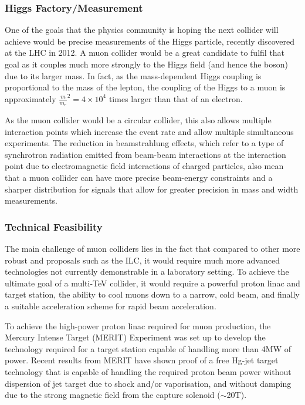 \subsubsection{Higgs Factory/Measurement}
 
One of the goals that the physics community is hoping the next collider will achieve would be precise measurements of the Higgs particle, recently discovered at the LHC in 2012.  A muon collider would be a great candidate to fulfil that goal as it couples much more strongly to the Higgs field (and hence the boson) due to its larger mass. In fact, as the mass-dependent Higgs coupling is proportional to the mass of the lepton, the coupling of the Higgs to a muon is approximately $\frac{m}{m_e}^2 = 4 \times 10^4$ times larger than that of an electron.
 
As the muon collider would be a circular collider, this also allows multiple interaction points which increase the event rate and allow multiple simultaneous experiments. The reduction in beamstrahlung effects, which refer to a type of synchrotron radiation emitted from beam-beam interactions at the interaction point due to electromagnetic field interactions of charged particles, also mean that a muon collider can have more precise beam-energy constraints and a sharper distribution for signals that allow for greater precision in mass and width measurements.

\subsubsection{Technical Feasibility}
 
The main challenge of muon colliders lies in the fact that compared to other more robust and proposals such as the ILC, it would require much more advanced technologies not currently demonstrable in a laboratory setting. To achieve the ultimate goal of a multi-TeV collider, it would require a powerful proton linac and target station, the ability to cool muons down to a narrow, cold beam, and finally a suitable acceleration scheme for rapid beam acceleration.
 
To achieve the high-power proton linac required for muon production, the Mercury Intense Target (MERIT) Experiment was set up to develop the technology required for a target station capable of handling  more than 4MW of power. Recent results from MERIT have shown proof of a free Hg-jet target technology that is capable of handling the required proton beam power without dispersion of jet target due to shock and/or vaporisation, and without damping due to the strong magnetic field from the capture solenoid ($\sim$20T).
 
